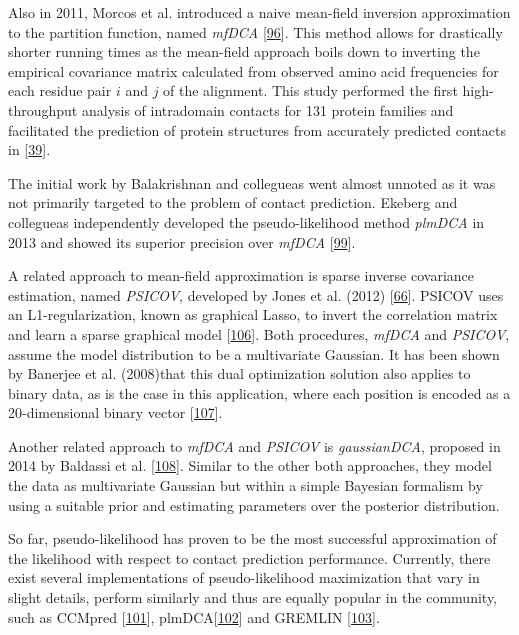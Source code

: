 \documentclass[11pt,a4paper,twoside]{book}
\theoremstyle{definition}
\theoremstyle{definition}
\theoremstyle{remark}
\begin{document}
Also in 2011, Morcos et al. introduced a naive mean-field inversion
approximation to the partition function, named \emph{mfDCA}
{[}\protect\hyperlink{ref-Morcos2011}{96}{]}. This method allows for
drastically shorter running times as the mean-field approach boils down
to inverting the empirical covariance matrix calculated from observed
amino acid frequencies for each residue pair \(i\) and \(j\) of the
alignment. This study performed the first high-throughput analysis of
intradomain contacts for 131 protein families and facilitated the
prediction of protein structures from accurately predicted contacts in
{[}\protect\hyperlink{ref-Marks2011}{39}{]}.

The initial work by Balakrishnan and collegueas went almost unnoted as
it was not primarily targeted to the problem of contact prediction.
Ekeberg and collegueas independently developed the pseudo-likelihood
method \emph{plmDCA} in 2013 and showed its superior precision over
\emph{mfDCA} {[}\protect\hyperlink{ref-Ekeberg2013}{99}{]}.

A related approach to mean-field approximation is sparse inverse
covariance estimation, named \emph{PSICOV}, developed by Jones et al.
(2012) {[}\protect\hyperlink{ref-Jones2012}{66}{]}. PSICOV uses an
L1-regularization, known as graphical Lasso, to invert the correlation
matrix and learn a sparse graphical model
{[}\protect\hyperlink{ref-Friedman2008}{106}{]}. Both procedures,
\emph{mfDCA} and \emph{PSICOV}, assume the model distribution to be a
multivariate Gaussian. It has been shown by Banerjee et al. (2008)that
this dual optimization solution also applies to binary data, as is the
case in this application, where each position is encoded as a
20-dimensional binary vector
{[}\protect\hyperlink{ref-Banerjee2008}{107}{]}.

Another related approach to \emph{mfDCA} and \emph{PSICOV} is
\emph{gaussianDCA}, proposed in 2014 by Baldassi et al.
{[}\protect\hyperlink{ref-Baldassi2014}{108}{]}. Similar to the other
both approaches, they model the data as multivariate Gaussian but within
a simple Bayesian formalism by using a suitable prior and estimating
parameters over the posterior distribution.

So far, pseudo-likelihood has proven to be the most successful
approximation of the likelihood with respect to contact prediction
performance. Currently, there exist several implementations of
pseudo-likelihood maximization that vary in slight details, perform
similarly and thus are equally popular in the community, such as CCMpred
{[}\protect\hyperlink{ref-Seemayer2014}{101}{]},
plmDCA{[}\protect\hyperlink{ref-Ekeberg2014}{102}{]} and GREMLIN
{[}\protect\hyperlink{ref-Kamisetty2013}{103}{]}.
\end{document}
